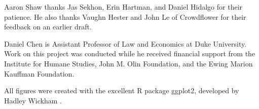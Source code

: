 \documentclass{cscw2010}
\begin{document}
Aaron Shaw thanks Jas Sekhon, Erin Hartman, and Daniel Hidalgo for their patience. He also thanks Vaughn Hester and John Le of Crowdflower for their feedback on an earlier draft.

Daniel Chen is Assistant Professor of Law and Economics at Duke
University. Work on this project was conducted while he received financial support from the Institute for Humane Studies, John M. Olin Foundation, and the Ewing Marion Kauffman Foundation.

All figures were created with the excellent R package ggplot2, developed by 
Hadley Wickham \cite{wickham2008ggplot2}.


%

%
\end{document}
